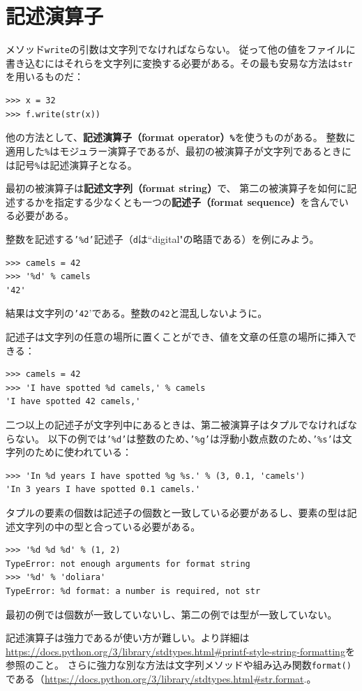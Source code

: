 \documentclass[a4j,12pt,makeidx]{jbook}
\begin{document}
\section{記述演算子}
メソッド{\tt write}の引数は文字列でなければならない。
従って他の値をファイルに書き込むにはそれらを文字列に変換する必要がある。その最も安易な方法は{\tt str}を用いるものだ：
\begin{verbatim}
>>> x = 32
>>> f.write(str(x))
\end{verbatim} \par
他の方法として、{\bf 記述演算子（format operator）{\tt \%}}を使うものがある。
整数に適用した{\tt \%}はモジュラー演算子であるが、最初の被演算子が文字列であるときには記号{\tt \%}は記述演算子となる。\par
最初の被演算子は{\bf 記述文字列（format string）}で、
第二の被演算子を如何に記述するかを指定する少なくとも一つの{\bf 記述子（format sequence）}を含んでいる必要がある。\par
整数を記述する{\tt '\%d'}記述子（{\tt d}は``digital"の略語である）を例にみよう。
\begin{verbatim}
>>> camels = 42
>>> '%d' % camels
'42'
\end{verbatim}
結果は文字列の{\tt '42}'である。整数の{\tt 42}と混乱しないように。\par
記述子は文字列の任意の場所に置くことができ、値を文章の任意の場所に挿入できる：
\begin{verbatim}
>>> camels = 42
>>> 'I have spotted %d camels,' % camels
'I have spotted 42 camels,'
\end{verbatim} \par
二つ以上の記述子が文字列中にあるときは、第二被演算子はタプルでなければならない。
以下の例では{\tt '\%d'}は整数のため、{\tt '\%g'}は浮動小数点数のため、{\tt '\%s'}は文字列のために使われている：
\begin{verbatim}
>>> 'In %d years I have spotted %g %s.' % (3, 0.1, 'camels')
'In 3 years I have spotted 0.1 camels.'
\end{verbatim} \par
タプルの要素の個数は記述子の個数と一致している必要があるし、要素の型は記述文字列の中の型と合っている必要がある。
\begin{verbatim}
>>> '%d %d %d' % (1, 2)
TypeError: not enough arguments for format string
>>> '%d' % 'doliara'
TypeError: %d format: a number is required, not str
\end{verbatim} 
最初の例では個数が一致していないし、第二の例では型が一致していない。\par
記述演算子は強力であるが使い方が難しい。より詳細は 
\url{https://docs.python.org/3/library/stdtypes.html#printf-style-string-formatting}を参照のこと。
さらに強力な別な方法は文字列メソッドや組み込み関数{\tt format()}である（\url{https://docs.python.org/3/library/stdtypes.html#str.format}.。
%
\end{document}
